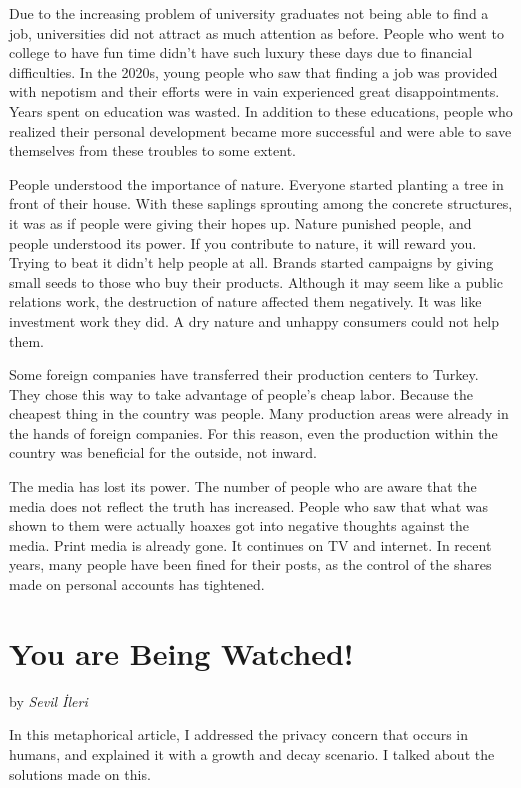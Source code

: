 \documentclass[]{book}
\begin{document}
Due to the increasing problem of university graduates not being able to find a job, universities did not attract as much attention as before. People who went to college to have fun time didn't have such luxury these days due to financial difficulties. In the 2020s, young people who saw that finding a job was provided with nepotism and their efforts were in vain experienced great disappointments. Years spent on education was wasted. In addition to these educations, people who realized their personal development became more successful and were able to save themselves from these troubles to some extent.

People understood the importance of nature. Everyone started planting a tree in front of their house. With these saplings sprouting among the concrete structures, it was as if people were giving their hopes up. Nature punished people, and people understood its power. If you contribute to nature, it will reward you. Trying to beat it didn't help people at all. Brands started campaigns by giving small seeds to those who buy their products. Although it may seem like a public relations work, the destruction of nature affected them negatively. It was like investment work they did. A dry nature and unhappy consumers could not help them.

Some foreign companies have transferred their production centers to Turkey. They chose this way to take advantage of people's cheap labor. Because the cheapest thing in the country was people. Many production areas were already in the hands of foreign companies. For this reason, even the production within the country was beneficial for the outside, not inward.

The media has lost its power. The number of people who are aware that the media does not reflect the truth has increased. People who saw that what was shown to them were actually hoaxes got into negative thoughts against the media. Print media is already gone. It continues on TV and internet. In recent years, many people have been fined for their posts, as the control of the shares made on personal accounts has tightened.

\hypertarget{you-are-being-watched}{%
\chapter{You are Being Watched!}\label{you-are-being-watched}}

by \emph{Sevil İleri}

In this metaphorical article, I addressed the privacy concern that occurs in humans, and explained it with a growth and decay scenario. I talked about the solutions made on this.
\end{document}
